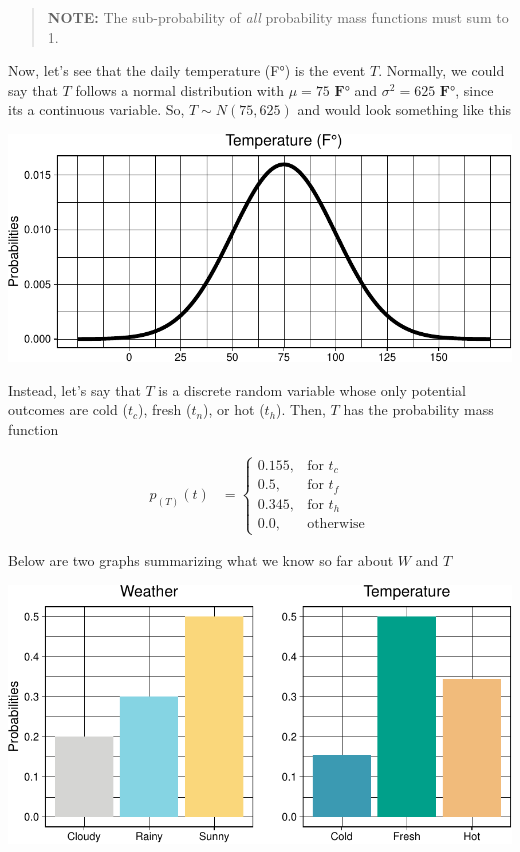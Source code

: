 \documentclass[
]{book}
\begin{document}
\hfill\break

\begin{quote}
\textbf{NOTE:} The sub-probability of \emph{all} probability mass functions must sum to 1.
\end{quote}

\hfill\break

Now, let's see that the daily temperature (F°) is the event \(T\). Normally, we could say that \(T\) follows a normal distribution with \(\mu = 75 \textbf{ F°}\) and \(\sigma^2 = 625 \textbf{ F°}\), since its a continuous variable. So, \(T \sim N(75, 625)\) and would look something like this

\begin{center}\includegraphics{455_HMM_files/figure-latex/unnamed-chunk-3-1} \end{center}

\hfill\break

Instead, let's say that \(T\) is a discrete random variable whose only potential outcomes are cold (\(t_c\)), fresh (\(t_n\)), or hot (\(t_h\)). Then, \(T\) has the probability mass function

\begin{align*} 
p_{(T)}(t)  &= \begin{cases}
    0.155, & \text{for } t_c \\
    0.5, & \text{for } t_f \\
    0.345, & \text{for } t_h \\
    0.0, & \text{otherwise}
\end{cases}
\end{align*}

\hfill\break

Below are two graphs summarizing what we know so far about \(W\) and \(T\)

\begin{center}\includegraphics{455_HMM_files/figure-latex/unnamed-chunk-6-1} \end{center}
\end{document}
